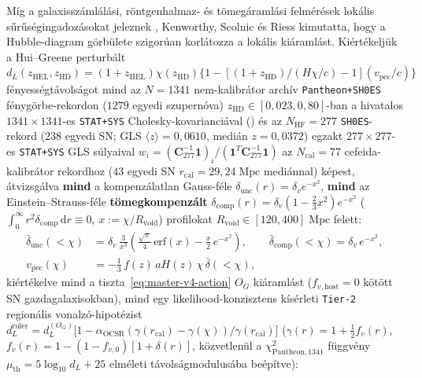 \documentclass[11pt,a4paper]{article}
\begin{document}
Míg a galaxisszámlálási, röntgenhalmaz- és tömegáramlási felmérések lokális sűrűségingadozásokat jeleznek \cite{Keenan2013KBC,Boehringer2020CLASSIX,Tully2023CF4}, Kenworthy, Scolnic és Riess \cite{Kenworthy2019LocalVoid} kimutatta, hogy a Hubble-diagram görbülete szigorúan korlátozza a lokális kiáramlást. Kiértékeljük a Hui--Greene perturbált $d_L(z_{\mathrm{HEL}}, z_{\mathrm{HD}}) = (1 + z_{\mathrm{HEL}})\chi(z_{\mathrm{HD}})\bigl\{1 - [(1+z_{\mathrm{HD}})/(H\chi/c) - 1](v_{\mathrm{pec}}/c)\bigr\}$ fényességtávolságot mind az $N = 1341$ nem-kalibrátor archív \texttt{Pantheon+SH0ES} fénygörbe-rekordon ($1279$ egyedi szupernóva) $z_{\mathrm{HD}} \in [0{,}023, 0{,}80]$-ban \cite{Brout2022PantheonPlus} a hivatalos $1341\times 1341$-es \texttt{STAT+SYS} Cholesky-kovarianciával () és az $N_{\mathrm{HF}} = 277$ \texttt{SH0ES}-rekord ($238$ egyedi SN; GLS $\langle z\rangle = 0{,}0610$, medián $z = 0{,}0372$) egzakt $277\times 277$-es \texttt{STAT+SYS} GLS súlyaival $w_i = (\mathbf{C}_{277}^{-1}\mathbf{1})_i/(\mathbf{1}^T\mathbf{C}_{277}^{-1}\mathbf{1})$ az $N_{\mathrm{cal}} = 77$ cefeida-kalibrátor rekordhoz ($43$ egyedi SN $r_{\mathrm{cal}} = 29{,}24\;\mathrm{Mpc}$ mediánnal) képest, átvizsgálva \textbf{mind} a kompenzálatlan Gauss-féle $\delta_{\mathrm{unc}}(r) = \delta_v e^{-x^2}$, \textbf{mind} az Einstein--Strauss-féle \textbf{tömegkompenzált} $\delta_{\mathrm{comp}}(r) = \delta_v(1 - \frac{2}{3}x^2)e^{-x^2}$ ($\int_0^\infty r^2\delta_{\mathrm{comp}}\,\mathrm{d}r \equiv 0$, $x := \chi/R_{\mathrm{void}}$) profilokat $R_{\mathrm{void}} \in [120, 400]\;\mathrm{Mpc}$ felett:
\begin{equation}
\begin{aligned}
  \bar{\delta}_{\mathrm{unc}}(<\chi) &= \delta_v\,\frac{3}{x^3}\left(\frac{\sqrt{\pi}}{4}\,\mathrm{erf}(x) - \frac{x}{2}\,e^{-x^2}\right), \qquad
  \bar{\delta}_{\mathrm{comp}}(<\chi) = \delta_v\,e^{-x^2}, \\
  v_{\mathrm{pec}}(\chi) &= -\frac{1}{3}\,f(z)\,a H(z)\,\chi\,\bar{\delta}(<\chi),
\end{aligned}
\label{eq:enclosed-gaussian}
\end{equation}
kiértékelve mind a tiszta~\eqref{eq:master-v4-action} $O_G$ kiáramlást ($f_{v,\mathrm{host}} = 0$ kötött SN gazdagalaxisokban), mind egy likelihood-konzisztens kísérleti \texttt{Tier-2} regionális vonalzó-hipotézist $d_L^{\mathrm{ruler}} = d_L^{(O_G)}\bigl[1 - \alpha_{\mathrm{OCSR}}(\gamma(r_{\mathrm{cal}}) - \gamma(\chi))/\gamma(r_{\mathrm{cal}})\bigr]$ ($\gamma(r) = 1 + \frac{1}{2}f_v(r)$, $f_v(r) = 1 - (1 - f_{v,0})[1 + \delta(r)]$, közvetlenül a $\chi^2_{\mathrm{Pantheon},1341}$ függvény $\mu_{\mathrm{th}} = 5\log_{10}d_L + 25$ elméleti távolságmodulusába beépítve):
\end{document}
